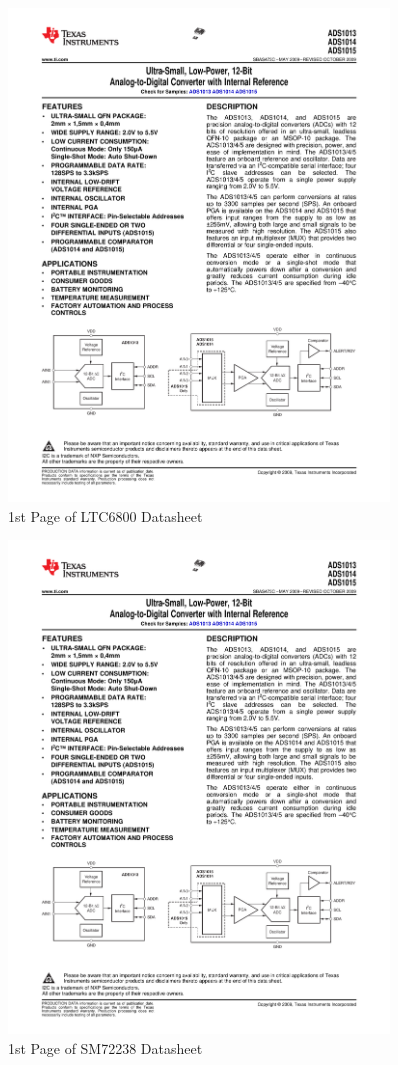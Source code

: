 \documentclass{article}
\begin{document}
{\begin{figure}[H]
	\centering
	\includegraphics[page=10,width=0.9\textwidth]{combined.pdf}
	\caption{1st Page of LTC6800 Datasheet}
	\label{fig:ltc6800dat}
\end{figure}

\begin{figure}[H]
	\centering
	\includegraphics[page=11,width=0.9\textwidth]{combined.pdf}
	\caption{1st Page of SM72238 Datasheet}
	\label{fig:sm72dat}
\end{figure}

}
\end{document}
